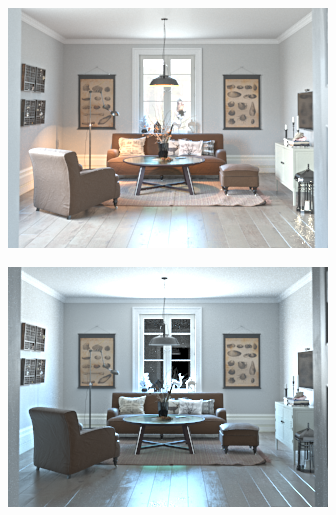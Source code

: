 \begin{figure}
  \centering
  \begin{subfigure}{0.4\linewidth}
    \includegraphics[width=\linewidth]{praca/images/AI43_008_Cam01.png}
  \end{subfigure}
  \begin{subfigure}{0.4\linewidth}
    \includegraphics[width=\linewidth]{praca/images/AI43_008_Cam01.VRayLightSelect_RE_L0.png}
  \end{subfigure}
  \begin{subfigure}{0.4\linewidth}

\end{subfigure}
\end{figure}
